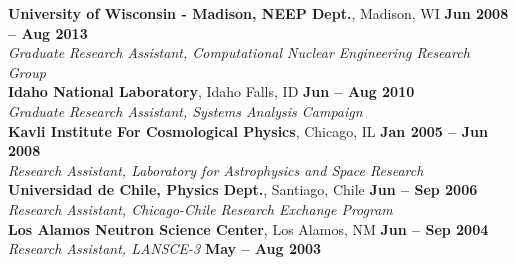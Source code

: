 \documentclass[margin,line]{resume}
\newcommand{\Cyclus}{\textsc{Cyclus}\xspace}%
\begin{document}
\begin{resume}
    \textbf{University of Wisconsin - Madison, NEEP Dept.}, Madison, WI \hfill \textbf{Jun 2008 -- Aug 2013}\\
		\textsl{Graduate Research Assistant, Computational Nuclear 
                Engineering Research Group}\vspace{2mm}\\
    \textbf{Idaho National Laboratory}, Idaho Falls, ID \hfill \textbf{Jun -- Aug 2010}\\
		\textsl{Graduate Research Assistant, Systems Analysis 
                Campaign}\vspace{2mm}\\
    \textbf{Kavli Institute For Cosmological Physics}, Chicago, IL \hfill \textbf{Jan 2005 -- Jun 2008}\\
                \textsl{Research Assistant, Laboratory for Astrophysics and 
                Space Research}\vspace{2mm}\\
    \textbf{Universidad de Chile, Physics Dept.}, Santiago, Chile \hfill \textbf{Jun -- Sep 2006}\\
                \textsl{Research Assistant, Chicago-Chile Research Exchange 
                Program}\vspace{2mm}\\
    \textbf{Los Alamos Neutron Science Center}, Los Alamos, NM \hfill \textbf{Jun -- Sep 2004}\\
                \textsl{Research Assistant, LANSCE-3} \hfill \textbf{May -- Aug 
                2003}
    \vspace{-4mm}

\end{resume}
\end{document}
